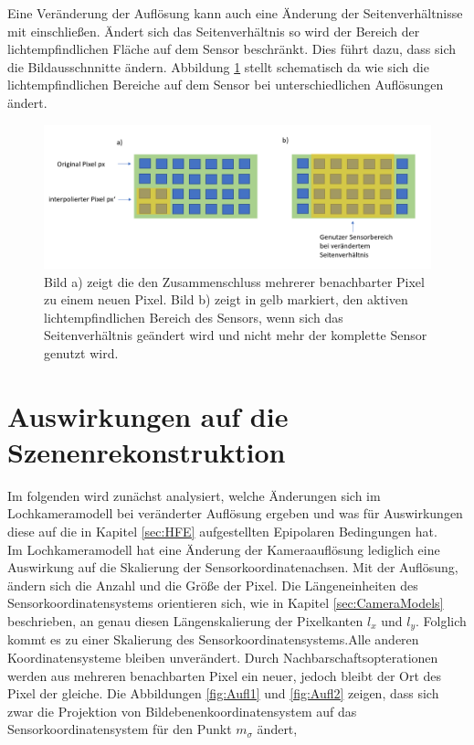 Eine Veränderung der Auflösung kann auch eine Änderung der Seitenverhältnisse mit einschließen. Ändert sich das Seitenverhältnis so wird der Bereich der lichtempfindlichen Fläche auf dem Sensor beschränkt\cite{Photonik}. Dies führt dazu, dass sich die Bildausschnnitte ändern. Abbildung \ref{fig:SensorResolutions} stellt schematisch da wie sich die lichtempfindlichen Bereiche auf dem Sensor bei unterschiedlichen Auflösungen ändert.



\begin{figure}[!htb]
	\centering
	\includegraphics[width=1.\linewidth]{images/AufloesungSensor.png}
	\caption[Nachbarschaftsoperation auf Sensoren]{Bild a) zeigt die den Zusammenschluss mehrerer benachbarter Pixel zu einem neuen Pixel. Bild b) zeigt in gelb markiert, den aktiven lichtempfindlichen Bereich des Sensors, wenn sich das Seitenverhältnis geändert wird und nicht mehr der komplette Sensor genutzt wird.} 
	\label{fig:SensorResolutions}
\end{figure}

\pagebreak

\section{Auswirkungen auf die Szenenrekonstruktion}

Im folgenden wird zunächst analysiert, welche Änderungen sich im Lochkameramodell bei veränderter Auflösung ergeben und was für Auswirkungen diese auf die in Kapitel \ref{sec:HFE} aufgestellten Epipolaren Bedingungen hat.\\

Im Lochkameramodell hat eine Änderung der Kameraauflösung lediglich eine Auswirkung auf die Skalierung der Sensorkoordinatenachsen. Mit der Auflösung, ändern sich die Anzahl und die Größe der Pixel. Die Längeneinheiten des Sensorkoordinatensystems orientieren sich, wie in Kapitel \ref{sec:CameraModels} beschrieben, an genau diesen Längenskalierung der Pixelkanten $l_x$ und $l_y$. Folglich kommt es zu einer Skalierung des Sensorkoordinatensystems.Alle anderen Koordinatensysteme bleiben unverändert. Durch Nachbarschaftsopterationen werden aus mehreren benachbarten Pixel ein neuer, jedoch bleibt der Ort des Pixel der gleiche\cite{Doessel}. Die Abbildungen \ref{fig:Aufl1} und \ref{fig:Aufl2} zeigen, dass sich zwar die Projektion von Bildebenenkoordinatensystem auf das Sensorkoordinatensystem für den Punkt $m_\sigma$ ändert, 

